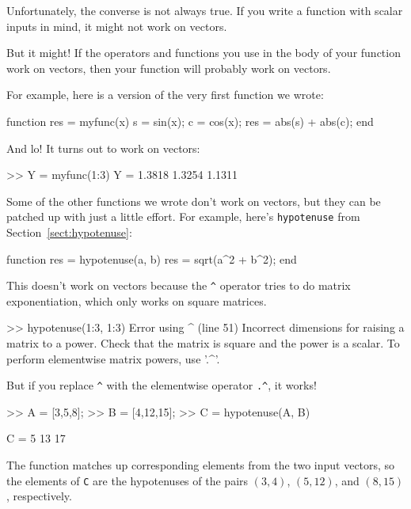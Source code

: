 \documentclass[
]{book}
\numberwithin{Answer}{chapter}
\numberwithin{Exercise}{chapter}
\begin{document}
Unfortunately, the converse is not always true.  If you write
a function with scalar inputs in mind, it might not work on vectors.

But it might!  If the operators and functions
you use in the body of your function work on vectors, then your
function will probably work on vectors.

For example, here is a version of the very first function we wrote:

\begin{code}
function res = myfunc(x)
    s = sin(x);
    c = cos(x);
    res = abs(s) + abs(c);
end
\end{code}

And lo!  It turns out to work on vectors:

\begin{code}
>> Y = myfunc(1:3)
Y = 1.3818    1.3254    1.1311
\end{code}

Some of the other functions we wrote don't work on vectors,
but they can be patched up with just a little effort.  For example,
here's {\tt hypotenuse} from Section~\ref{sect:hypotenuse}:

\begin{code}
function res = hypotenuse(a, b)
    res = sqrt(a^2 + b^2);
end
\end{code}

This doesn't work on vectors because the \verb+^+ operator
tries to do matrix exponentiation, which only works on
square matrices.


\begin{code}
>> hypotenuse(1:3, 1:3)
Error using  ^  (line 51)
Incorrect dimensions for raising a matrix to a power. 
Check that the matrix is square and the power is a scalar. 
To perform elementwise matrix powers, use '.^'.
\end{code}

But if you replace \verb+^+ with the elementwise operator
\verb+.^+, it works!


\begin{code}
>> A = [3,5,8];
>> B = [4,12,15];
>> C = hypotenuse(A, B)

C = 5    13    17
\end{code}

The function matches up corresponding elements from the two
input vectors, so the elements of {\tt C} are the hypotenuses of
the pairs $(3,4)$, $(5,12)$, and $(8,15)$, respectively.
\end{document}
